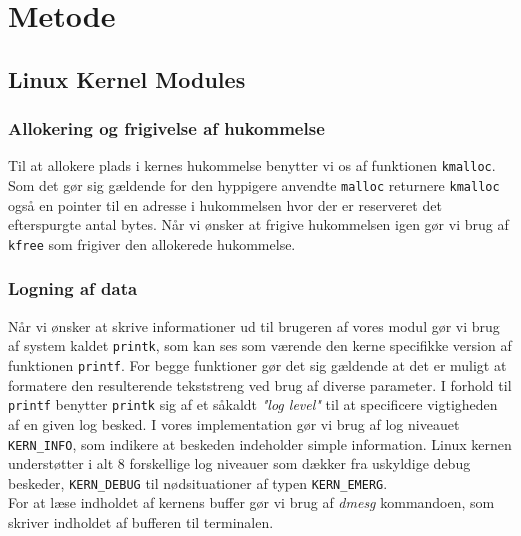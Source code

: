 \documentclass[main.tex]{subfile}
\begin{document}
\section{Metode}
\subsection{Linux Kernel Modules}
\subsubsection*{Allokering og frigivelse af hukommelse}
Til at allokere plads i kernes hukommelse benytter vi os af funktionen \texttt{kmalloc}. Som det gør sig gældende for den hyppigere anvendte \texttt{malloc} returnere \texttt{kmalloc} også en pointer til en adresse i hukommelsen hvor der er reserveret det efterspurgte antal bytes. Når vi ønsker at frigive hukommelsen igen gør vi brug af \texttt{kfree} som frigiver den allokerede hukommelse.

\subsubsection*{Logning af data}
Når vi ønsker at skrive informationer ud til brugeren af vores modul gør vi brug af system kaldet \texttt{printk}, som kan ses som værende den kerne specifikke version af funktionen \texttt{printf}. For begge funktioner gør det sig gældende at det er muligt at formatere den resulterende tekststreng ved brug af diverse parameter. I forhold til \texttt{printf} benytter \texttt{printk} sig af et såkaldt \emph{"log level"} til at specificere vigtigheden af en given log besked. I vores implementation gør vi brug af log niveauet \texttt{KERN\_INFO}, som indikere at beskeden indeholder simple information. Linux kernen understøtter i alt 8 forskellige log niveauer som dækker fra uskyldige debug beskeder, \texttt{KERN\_DEBUG} til nødsituationer af typen \texttt{KERN\_EMERG}.\\

For at læse indholdet af kernens buffer gør vi brug af \emph{dmesg} kommandoen, som skriver indholdet af bufferen til terminalen. 
\end{document}
